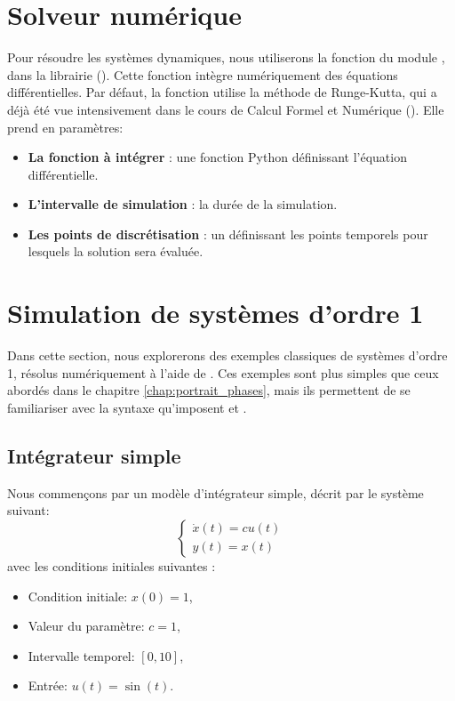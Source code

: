     \section{Solveur numérique}
        Pour résoudre les systèmes dynamiques, nous utiliserons la fonction  du module , dans la librairie  (\cite{Scipy2020}). Cette fonction intègre numériquement des équations différentielles. Par défaut, la fonction  utilise la méthode de Runge-Kutta, qui a déjà été vue intensivement dans le cours de Calcul Formel et Numérique (\cite{infof205}). Elle prend en paramètres:
        \begin{itemize}
            \item \textbf{La fonction à intégrer} : une fonction Python définissant l’équation différentielle.
            \item \textbf{L'intervalle de simulation} : la durée de la simulation.
            \item \textbf{Les points de discrétisation} : un  définissant les points temporels pour lesquels la solution sera évaluée.
        \end{itemize}

    \section{Simulation de systèmes d'ordre 1}
        Dans cette section, nous explorerons des exemples classiques de systèmes d'ordre 1, résolus numériquement à l'aide de . Ces exemples sont plus simples que ceux abordés dans le chapitre \ref{chap:portrait_phases}, mais ils permettent de se familiariser avec la syntaxe qu'imposent  et .
    
        \subsection{Intégrateur simple}
            Nous commençons par un modèle d'intégrateur simple, décrit par le système suivant:
            \begin{equation*}\label{eq:integrateur_simple}
                \begin{cases}
                    \dot x(t)=c u(t)\\
                    y(t)=x(t)
                \end{cases}
            \end{equation*}
            avec les conditions initiales suivantes :
            \begin{itemize}
                \item Condition initiale: $x(0)=1$,
                \item Valeur du paramètre: $c=1$,
                \item Intervalle temporel: $[0,10]$,
                \item Entrée: $u(t)=\sin(t)$.
            \end{itemize}

